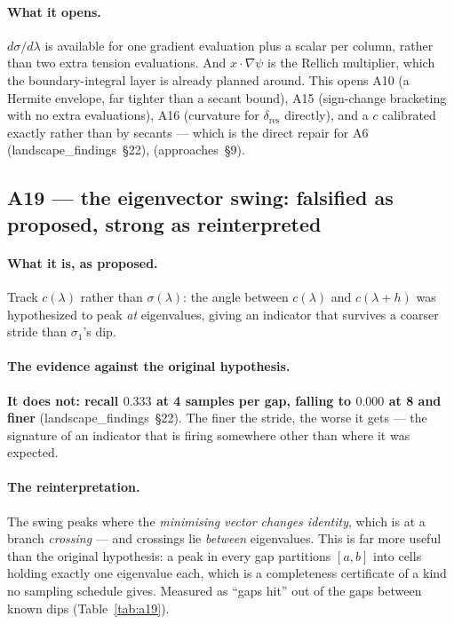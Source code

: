 \documentclass[11pt]{article}
\newcommand{\lf}[1]{(landscape\_findings~\S#1)}
\newcommand{\ap}[1]{(approaches~\S#1)}
\newcommand{\sig}{\sigma}
\newcommand{\sione}{\sig_1}
\newcommand{\lam}{\lambda}
\begin{document}
\paragraph{What it opens.} $d\sig/d\lam$ is available for one gradient evaluation plus a scalar
per column, rather than two extra tension evaluations. And $x\cdot\nabla\psi$ is the Rellich
multiplier, which the boundary-integral layer is already planned around. This opens A10 (a Hermite
envelope, far tighter than a secant bound), A15 (sign-change bracketing with no extra evaluations),
A16 (curvature for $\delta_{\mathrm{res}}$ directly), and a $c$ calibrated exactly rather than by
secants --- which is the direct repair for A6 \lf{22}, \ap{9}.

\subsection{A19 --- the eigenvector swing: falsified as proposed, strong as reinterpreted}
\label{sec:a19}

\paragraph{What it is, as proposed.} Track $c(\lam)$ rather than $\sig(\lam)$: the angle between
$c(\lam)$ and $c(\lam+h)$ was hypothesized to peak \emph{at} eigenvalues, giving an indicator that
survives a coarser stride than $\sione$'s dip.

\paragraph{The evidence against the original hypothesis.} \textbf{It does not: recall $0.333$ at
4 samples per gap, falling to $0.000$ at 8 and finer} \lf{22}. The finer the stride, the worse it
gets --- the signature of an indicator that is firing somewhere other than where it was expected.

\paragraph{The reinterpretation.} The swing peaks where the \emph{minimising vector changes
identity}, which is at a branch \emph{crossing} --- and crossings lie \emph{between} eigenvalues.
This is far more useful than the original hypothesis: a peak in every gap partitions $[a,b]$ into
cells holding exactly one eigenvalue each, which is a completeness certificate of a kind no
sampling schedule gives. Measured as ``gaps hit'' out of the gaps between known dips
(Table~\ref{tab:a19}).
\end{document}
